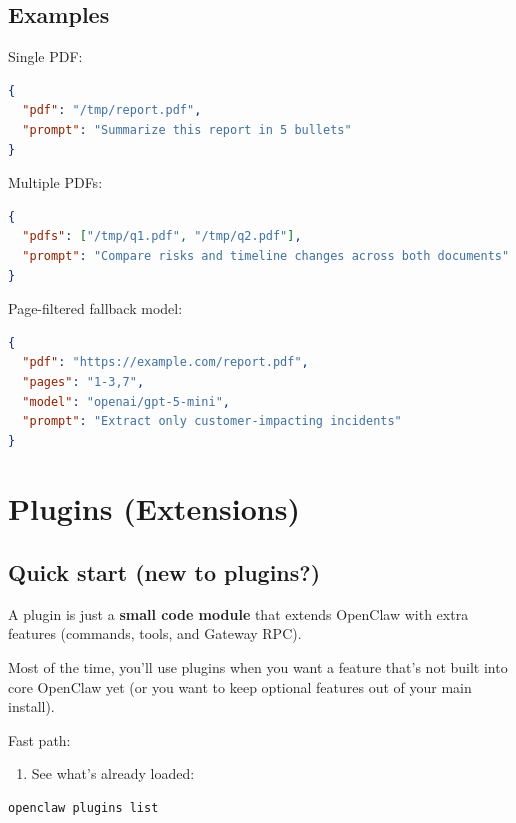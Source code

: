 \subsection{Examples}


Single PDF:

\begin{lstlisting}[language=json]
{
  "pdf": "/tmp/report.pdf",
  "prompt": "Summarize this report in 5 bullets"
}
\end{lstlisting}


Multiple PDFs:

\begin{lstlisting}[language=json]
{
  "pdfs": ["/tmp/q1.pdf", "/tmp/q2.pdf"],
  "prompt": "Compare risks and timeline changes across both documents"
}
\end{lstlisting}


Page-filtered fallback model:

\begin{lstlisting}[language=json]
{
  "pdf": "https://example.com/report.pdf",
  "pages": "1-3,7",
  "model": "openai/gpt-5-mini",
  "prompt": "Extract only customer-impacting incidents"
}
\end{lstlisting}



\clearpage

\section{Plugins (Extensions)}


\subsection{Quick start (new to plugins?)}


A plugin is just a \textbf{small code module} that extends OpenClaw with extra
features (commands, tools, and Gateway RPC).

Most of the time, you’ll use plugins when you want a feature that’s not built
into core OpenClaw yet (or you want to keep optional features out of your main
install).

Fast path:

\begin{enumerate}
  \item See what’s already loaded:
\end{enumerate}


\begin{lstlisting}[language=bash]
openclaw plugins list
\end{lstlisting}


